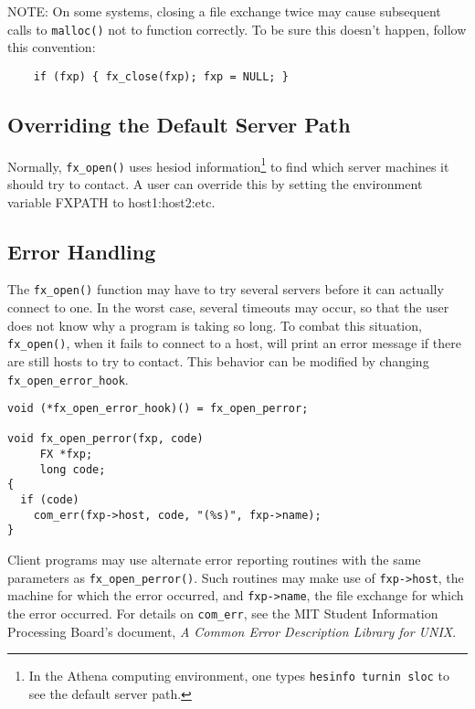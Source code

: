 NOTE: On some systems, closing a file exchange twice may cause
subsequent calls to \verb+malloc()+ not to function correctly.  To be
sure this doesn't happen, follow this convention:

\begin{verbatim}
	if (fxp) { fx_close(fxp); fxp = NULL; }
\end{verbatim}

\subsection{Overriding the Default Server Path}

Normally, \verb+fx_open()+ uses hesiod information\footnote{In the
Athena computing environment, one types
\verb+hesinfo turnin sloc+ to see the default server path.} to find
which server machines it should try to contact.  A user can
override this by setting the environment variable FXPATH to
host1:host2:etc.

\subsection{Error Handling}

The \verb+fx_open()+ function may have to try several servers before it
can actually connect to one.  In the worst case, several timeouts may
occur, so that the user does not know why a program is taking so long.
To combat this situation, \verb+fx_open()+, when it fails to connect
to a host, will print an error message if there are still hosts to try
to contact. This behavior can be modified by changing
\verb+fx_open_error_hook+.

\begin{verbatim}
void (*fx_open_error_hook)() = fx_open_perror;

void fx_open_perror(fxp, code)
     FX *fxp;
     long code;
{
  if (code)
    com_err(fxp->host, code, "(%s)", fxp->name);
}

\end{verbatim}

Client programs may use alternate error reporting routines with the
same parameters as \verb+fx_open_perror()+.  Such routines may make
use of \verb+fxp->host+, the machine for which the error occurred, and
\verb+fxp->name+, the file exchange for which the error occurred.  For
details on \verb+com_err+, see the MIT Student Information Processing
Board's document, {\it A Common Error Description Library for UNIX}.

\pagebreak[3]

